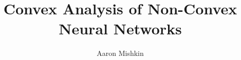 \documentclass[12pt]{report}
\title{Convex Analysis of Non-Convex Neural Networks}
\author{Aaron Mishkin}
\begin{document}
\beforepreface







\newpage

\afterpreface













\printbibliography[]


\appendix







\end{document}
